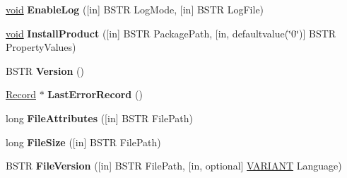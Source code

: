 \begin{DoxyCompactItemize}
\item 
\mbox{\label{interface_windows_installer_1_1_installer_ac2fd72fb734ef2a390652e1dd0c07b3a}} 
\hyperlink{interfacevoid}{void} {\bfseries Enable\+Log} (\mbox{[}in\mbox{]} B\+S\+TR Log\+Mode, \mbox{[}in\mbox{]} B\+S\+TR Log\+File)
\item 
\mbox{\label{interface_windows_installer_1_1_installer_af24bc215ce2ba71a9ed5bd94304a45f3}} 
\hyperlink{interfacevoid}{void} {\bfseries Install\+Product} (\mbox{[}in\mbox{]} B\+S\+TR Package\+Path, \mbox{[}in, defaultvalue(\char`\"{}0\char`\"{})\mbox{]} B\+S\+TR Property\+Values)
\item 
\mbox{\label{interface_windows_installer_1_1_installer_a27fbe83396772862f16c5c675f438474}} 
B\+S\+TR {\bfseries Version} ()
\item 
\mbox{\label{interface_windows_installer_1_1_installer_a1bcf90cd2eb97e50c718735a342d9562}} 
\hyperlink{interface_windows_installer_1_1_record}{Record} $\ast$ {\bfseries Last\+Error\+Record} ()
\item 
\mbox{\label{interface_windows_installer_1_1_installer_ad312ce0934d3de206b82986b9c2fc5f5}} 
long {\bfseries File\+Attributes} (\mbox{[}in\mbox{]} B\+S\+TR File\+Path)
\item 
\mbox{\label{interface_windows_installer_1_1_installer_a62ef091c9894559a58b9b19e72cf86f0}} 
long {\bfseries File\+Size} (\mbox{[}in\mbox{]} B\+S\+TR File\+Path)
\item 
\mbox{\label{interface_windows_installer_1_1_installer_a2a2b64b4a6528fe4cd7bfbc5cbedc41b}} 
B\+S\+TR {\bfseries File\+Version} (\mbox{[}in\mbox{]} B\+S\+TR File\+Path, \mbox{[}in, optional\mbox{]} \hyperlink{structtag_v_a_r_i_a_n_t}{V\+A\+R\+I\+A\+NT} Language)
\end{DoxyCompactItemize}

